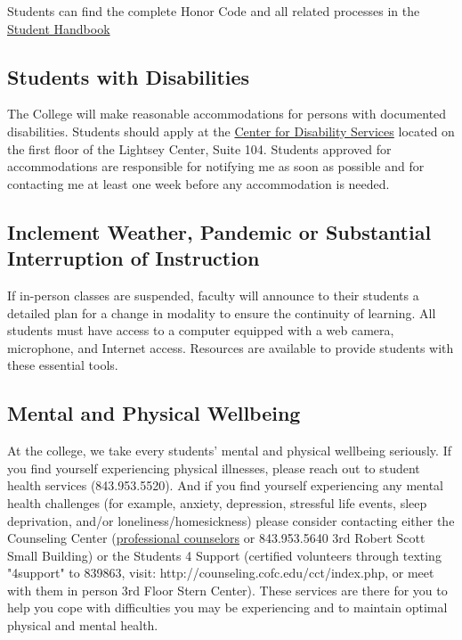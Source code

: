 \vspace{0.10in}
\noindent Students can find the complete Honor Code and all related processes in the \href{http://studentaffairs.cofc.edu/honor-system/studenthandbook/index.php}{Student Handbook} 

\subsection{Students with
Disabilities}\label{students-with-disabilities}

The College will make reasonable accommodations for persons with
documented disabilities. Students should apply at the
\href{http://disabilityservices.cofc.edu}{Center for Disability
Services} located on the first floor of the Lightsey Center, Suite 104.
Students approved for accommodations are responsible for notifying me as
soon as possible and for contacting me at least one week before any
accommodation is needed.

\subsection{Inclement Weather, Pandemic or Substantial Interruption of Instruction}

If in-person classes are suspended, faculty will announce to their students a detailed plan for a change in modality to ensure the continuity of learning. All students must have access to a computer equipped with a web camera, microphone, and Internet access. Resources are available to provide students with these essential tools.


\subsection{Mental and Physical Wellbeing}

At the college, we take every students’ mental and physical wellbeing seriously. If you find yourself experiencing physical illnesses, please reach out to student health services (843.953.5520). And if you find yourself experiencing any mental health challenges (for example, anxiety, depression, stressful life events, sleep deprivation, and/or loneliness/homesickness) please consider contacting either the Counseling Center (\href{http://counseling.cofc.edu}{professional counselors} or 843.953.5640 3rd Robert Scott Small Building) or the Students 4 Support (certified volunteers through texting "4support" to 839863, visit: http://counseling.cofc.edu/cct/index.php, or meet with them in person 3rd Floor Stern Center).  These services are there for you to help you cope with difficulties you may be experiencing and to maintain optimal physical and mental health.

